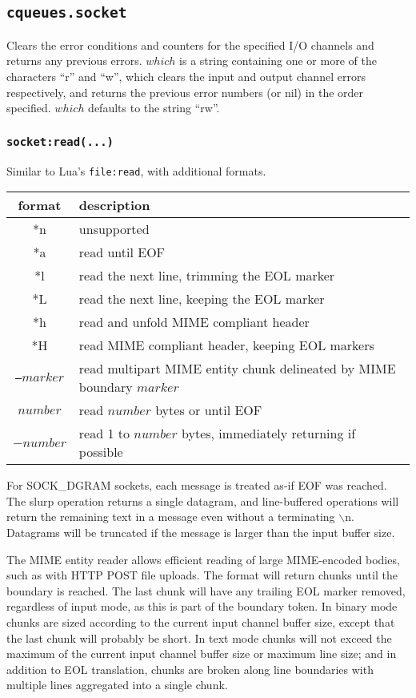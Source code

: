 \documentclass[11pt, oneside]{memoir}
\newcommand*{\fn}[1]{\texttt{#1}\xspace}
\newcommand*{\lf}[0]{$\backslash$n\xspace}
\newcounter{toccols}
\newenvironment{Module}[1]{
	\subsection{\texttt{#1}}
	\addtocontents{toc}{
		\protect\begin{multicols}{\value{toccols}}
	}
}{
	\addtocontents{toc}{\protect\end{multicols}}
}
\begin{document}
\begin{Module}{cqueues.socket}
Clears the error conditions and counters for the specified I/O channels and returns any previous errors. $which$ is a string containing one or more of the characters ``r'' and ``w'', which clears the input and output channel errors respectively, and returns the previous error numbers (or nil) in the order specified. $which$ defaults to the string ``rw''.

\subsubsection[\fn{socket:read}]{\fn{socket:read(...)}}
Similar to Lua's \fn{file:read}, with additional formats.

\begin{tabular}{c | l}
format & description\\\hline
{*n} & unsupported \\
{*a} & read until EOF \\
{*l} & read the next line, trimming the EOL marker \\
{*L} & read the next line, keeping the EOL marker \\
{*h} & read and unfold MIME compliant header \\
{*H} & read MIME compliant header, keeping EOL markers \\
{\texttt{--}$marker$} & read multipart MIME entity chunk delineated by MIME boundary $marker$ \\
$number$ & read $number$ bytes or until EOF \\
$-number$ & read 1 to $number$ bytes, immediately returning if possible \\
\end{tabular}

For SOCK\_DGRAM sockets, each message is treated as-if EOF was reached. The slurp operation returns a single datagram, and line-buffered operations will return the remaining text in a message even without a terminating \lf. Datagrams will be truncated if the message is larger than the input buffer size.

The MIME entity reader allows efficient reading of large MIME-encoded bodies, such as with HTTP POST file uploads. The format will return chunks until the boundary is reached. The last chunk will
have any trailing EOL marker removed, regardless of input mode, as this is part of the boundary token. In binary mode chunks are sized according to the current input channel buffer size, except that the last chunk will probably be short. In text mode chunks will not exceed the maximum of the current input channel buffer size or maximum line size; and in addition to EOL translation, chunks are broken along line boundaries with multiple lines aggregated into a single chunk.


\end{Module}
\end{document}
